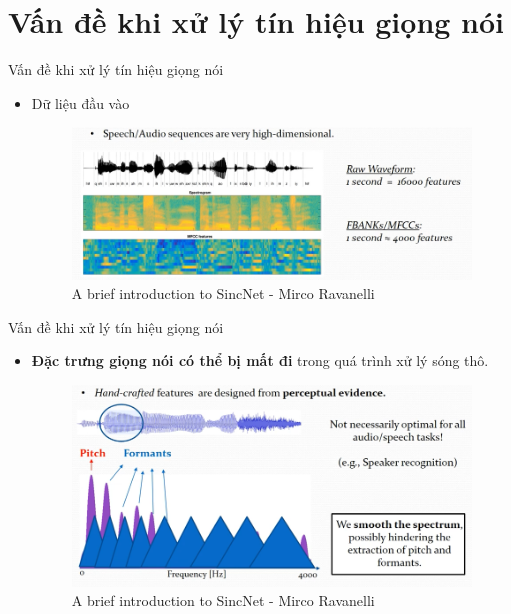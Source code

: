 \documentclass[notheorems, aspectratio=54]{beamer}
\begin{document}
\section{Vấn đề khi xử lý tín hiệu giọng nói}
\begin{frame}{Vấn đề khi xử lý tín hiệu giọng nói}
	\begin{itemize}
		\item Dữ liệu đầu vào
		\begin{figure}[H]
			\includegraphics[width=1\linewidth]{images/capture_01.png}
			\caption{A brief introduction to SincNet - Mirco Ravanelli}
			\label{fig:writing-thesis}
		\end{figure}
	\end{itemize}
\end{frame}
\begin{frame}{Vấn đề khi xử lý tín hiệu giọng nói}
	\begin{itemize}
		\item \textbf{Đặc trưng giọng nói có thể bị mất đi} trong quá trình xử lý sóng thô.
		\begin{figure}[H]
			\includegraphics[width=0.9\linewidth]{images/perceptual_evidence.png}
			\caption{A brief introduction to SincNet - Mirco Ravanelli}
			\label{fig:writing-thesis}
		\end{figure}
	\end{itemize}
\end{frame}
\end{document}
